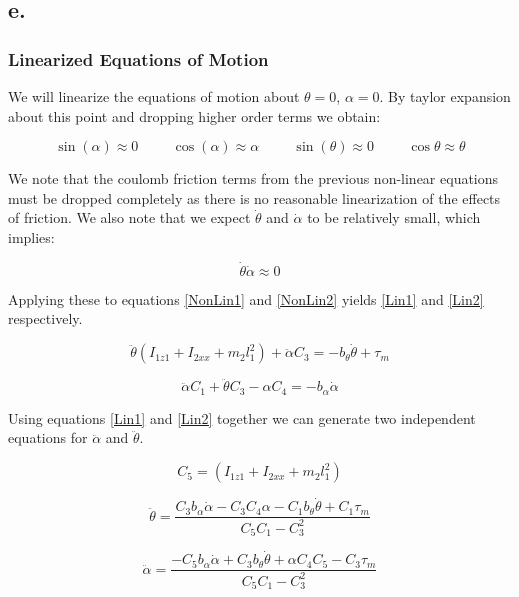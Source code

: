 \documentclass{article}
\theoremstyle{plain}
\theoremstyle{definition}
\theoremstyle{remark}
\begin{document}
\subsection*{e.}
\subsubsection*{Linearized Equations of Motion}

We will linearize the equations of motion about $\theta = 0$, $\alpha = 0$.  By taylor expansion about this point and dropping higher order terms we obtain: 

 $$ \sin(\alpha) \approx 0 \hspace{1cm} \cos(\alpha) \approx \alpha \hspace{1cm} \sin(\theta) \approx 0 \hspace{1cm} \cos{\theta} \approx \theta $$

We note that the coulomb friction terms from the previous non-linear equations must be dropped completely as there is no reasonable linearization of the effects of friction.  We also note that we expect $\dot{\theta}$ and $\dot{\alpha}$ to be relatively small, which implies: 

$$ \dot{\theta} \dot{\alpha} \approx 0 $$

Applying these to equations \eqref{NonLin1} and \eqref{NonLin2} yields \eqref{Lin1} and \eqref{Lin2} respectively.

\begin{equation}
\ddot{\theta} \left( I_{1z1} + I_{2xx} + m_2 l_1^2 \right) + \ddot{\alpha} C_3 = -b_{\theta} \dot{\theta} + \tau_{m}
\label{Lin1}
\end{equation}

\begin{equation}
\ddot{\alpha} C_1 + \ddot{\theta} C_3 - \alpha C_4 = -b_{\alpha} \dot{\alpha} 
\label{Lin2}
\end{equation}

Using equations \eqref{Lin1} and \eqref{Lin2} together we can generate two independent equations for $\ddot{\alpha}$ and $\ddot{\theta}$.

$$ C_{5} = (I_{1z1} + I_{2xx} + m_2 l_1^2) $$

\begin{equation}
\ddot{\theta} = \frac{C_3 b_{\alpha} \dot{\alpha} - C_3 C_4 \alpha - C_1 b_{\theta} \dot{\theta} + C_1 \tau_{m}}{ C_5 C_1 - C_3^2}
\label{Lin_Theta}
\end{equation}

\begin{equation}
\ddot{\alpha} = \frac{-C_5 b_{\alpha} \dot{\alpha}  + C_3 b_{\theta} \dot{\theta}  + \alpha C_4 C_5 - C_3 \tau_m }{C_5 C_1 - C_3^2}
\label{Lin_Alpha}
\end{equation}
\end{document}
